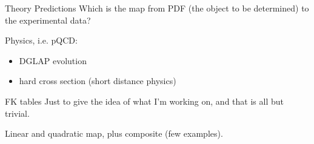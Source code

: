 \documentclass[9pt]{beamer}
\begin{document}
\begin{frame}{Theory Predictions}
    Which is the map from PDF (the object to be determined) to the experimental
    data?

    Physics, i.e. pQCD:
    \begin{itemize}
        \item DGLAP evolution
        \item hard cross section (short distance physics)
    \end{itemize}
\end{frame}

\begin{frame}{FK tables}
    Just to give the idea of what I'm working on, and that is all but trivial.

    Linear and quadratic map, plus composite (few examples).
\end{frame}
\end{document}
